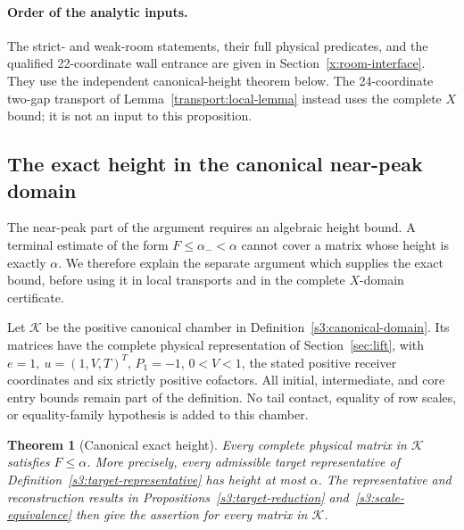 \documentclass[11pt,reqno]{amsart}
\newtheorem{theorem}{Theorem}[section]
\theoremstyle{definition}
\theoremstyle{remark}
\newcommand{\amin}{\alpha_-}
\begin{document}
\paragraph{Order of the analytic inputs.}
The strict- and weak-room statements, their full physical predicates,
and the qualified 22-coordinate wall entrance are given in
Section~\ref{x:room-interface}. They use the independent
canonical-height theorem below. The 24-coordinate two-gap transport
of Lemma~\ref{transport:local-lemma} instead uses the complete
\(X\) bound; it is not an input to this proposition.

\subsection{The exact height in the canonical near-peak domain}
\label{s3:main}

The near-peak part of the argument requires an algebraic height bound.
A terminal estimate of the form \(F\le\amin<\alpha\) cannot cover a
matrix whose height is exactly \(\alpha\). We therefore explain the
separate argument which supplies the exact bound, before using it in
local transports and in the complete \(X\)-domain certificate.

Let \(\mathcal K\) be the positive canonical chamber in
Definition~\ref{s3:canonical-domain}. Its matrices have the complete
physical representation of Section~\ref{sec:lift}, with
\(e=1,\ u=(1,V,T)^T\), \(P_1=-1\), \(0<V<1\), the stated positive receiver
coordinates and six strictly positive cofactors. All initial,
intermediate, and core entry bounds remain part of the definition.
No tail contact, equality of row scales, or equality-family hypothesis
is added to this chamber.

\begin{theorem}[Canonical exact height]\label{s3:canonical-height-main}
Every complete physical matrix in \(\mathcal K\) satisfies
\(F\le\alpha\). More precisely, every admissible target representative
of Definition~\ref{s3:target-representative} has height at most
\(\alpha\). The representative and reconstruction results in
Propositions~\ref{s3:target-reduction} and~\ref{s3:scale-equivalence}
then give the assertion for every matrix in \(\mathcal K\).
\end{theorem}
\end{document}
